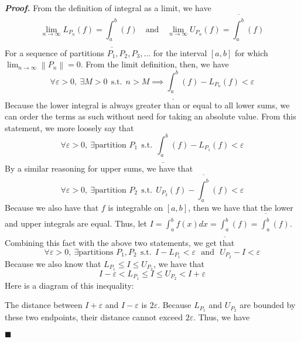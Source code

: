 \documentclass[10pt]{article}
\newcommand\norm[1]{\left\lVert#1\right\rVert}
\newenvironment{proof}{\par\textit{\textbf{Proof.}}}{\hfill$\blacksquare$}
\newcommand{\suchthat}{~~\text{s.t.}~~}
\begin{document}
\begin{proof}
    From the definition of integral as a limit, we have
    $$
        \lim_{n\to\infty} L_{P_n}(f)=\underline{\int_a^b}(f)
        \quad\text{and}\quad
        \lim_{n\to\infty} U_{P_n}(f)=\overline{\int_a^b}(f)
    $$
    For a sequence of partitions $P_1,P_2,P_3,\dots$ for the interval $[a,b]$ for which $\displaystyle\lim_{n\to\infty}\norm{P_n}=0$.
    From the limit definition, then, we have
    $$
        \forall \varepsilon>0,~\exists M>0\suchthat n>M\implies \underline{\int_a^b}(f)-L_{P_n}(f)<\varepsilon
    $$
    Because the lower integral is always greater than or equal to all lower sums, we can order the terms as such without need for taking an absolute value. From this statement, we more loosely say that
    $$
        \forall \varepsilon>0,~\exists \text{partition $P_1$}\suchthat\underline{\int_a^b}(f)-L_{P_1}(f)<\varepsilon
    $$
    By a similar reasoning for upper sums, we have that
    $$
        \forall \varepsilon>0,~\exists \text{partition $P_2$}\suchthat U_{P_2}(f)-\overline{\int_a^b}(f)<\varepsilon
    $$
    Because we also have that $f$ is integrable on $[a,b]$, then we have that the lower and upper integrals are equal. Thus, let $I=\int_a^bf(x)dx = \underline{\int_a^b}(f) = \overline{\int_a^b}(f)$. Combining this fact with the above two statements, we get that
    $$
        \forall \varepsilon>0,~\exists \text{partitions $P_1,P_2$}\suchthat I-L_{P_1}<\varepsilon\text{~~and~~}U_{P_2}-I<\varepsilon
    $$
    Because we also know that $L_{P_1}\leq I \leq U_{P_2}$, we have that
    $$
        I-\varepsilon < L_{P_1} \leq I \leq U_{P_2} < I+\varepsilon
    $$
    Here is a diagram of this inequality:
    \begin{center}
    \end{center}
    The distance between $I+\varepsilon$ and $I-\varepsilon$ is $2\varepsilon$. Because $L_{P_1}$ and $U_{P_2}$ are bounded by these two endpoints, their distance cannot exceed $2\varepsilon$. Thus, we have

\end{proof}
\end{document}
